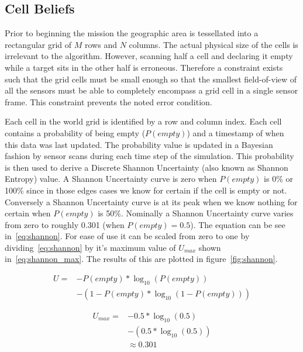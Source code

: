 \subsection{Cell Beliefs}
Prior to beginning the mission the geographic area is tessellated into a rectangular grid of $M$ rows and $N$ columns.  The actual physical size of the cells is irrelevant to the algorithm.  However, scanning half a cell and declaring it empty while a target sits in the other half is erroneous.  Therefore a constraint exists such that the grid cells must be small enough so that the smallest field-of-view of all the sensors must be able to completely encompass a grid cell in a single sensor frame.  This constraint prevents the noted error condition.

Each cell in the world grid is identified by a row and column index.  Each cell contains a probability of being empty ($P(empty)$) and a timestamp of when this data was last updated.  The probability value is updated in a Bayesian fashion by sensor scans during each time step of the simulation.  This probability is then used to derive a Discrete Shannon Uncertainty (also known as Shannon Entropy) value.  A Shannon Uncertainty curve is zero when $P(empty)$ is 0\% or 100\% since in those edges cases we know for certain if the cell is empty or not.  Conversely a Shannon Uncertainty curve is at its peak when we know nothing for certain when $P(empty)$ is 50\%.  Nominally a Shannon Uncertainty curve varies from zero to roughly 0.301 (when $P(empty) = 0.5$).  The equation can be see in~\ref{eq:shannon}.  For ease of use it can be scaled from zero to one by dividing~\ref{eq:shannon} by it's maximum value of $U_{max}$ shown in~\ref{eq:shannon_max}.  The results of this are plotted in figure~\ref{fig:shannon}.

\begin{equation}
	\label{eq:shannon}
	\begin{split}
		U = & -P(empty) * \log_{10}(P(empty)) \\
            & - ( 1-P(empty) * \log_{10}(1-P(empty)))
	\end{split}
\end{equation}

\begin{equation}
	\label{eq:shannon_max}
	\begin{split}
		U_{max} = & -0.5 * \log_{10}(0.5) \\
		          & - (0.5 * \log_{10}(0.5)) \\
		          & \approx 0.301
	\end{split}
\end{equation}

